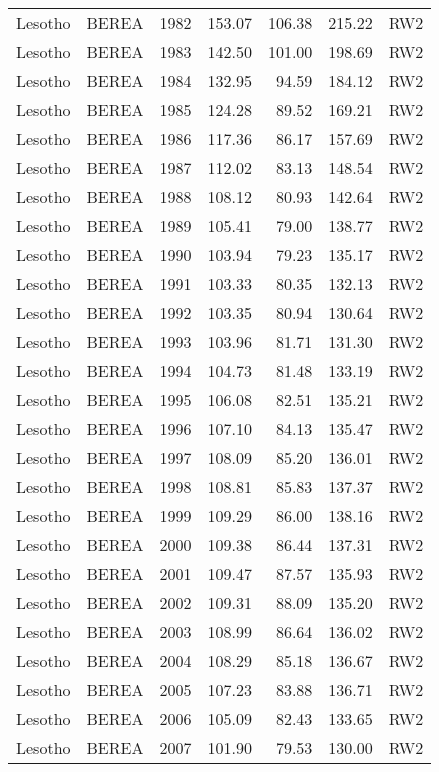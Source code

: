 \begin{longtable}{lllrrrl}
  Lesotho & BEREA & 1982 & 153.07 & 106.38 & 215.22 & RW2 \\ 
  Lesotho & BEREA & 1983 & 142.50 & 101.00 & 198.69 & RW2 \\ 
  Lesotho & BEREA & 1984 & 132.95 & 94.59 & 184.12 & RW2 \\ 
  Lesotho & BEREA & 1985 & 124.28 & 89.52 & 169.21 & RW2 \\ 
  Lesotho & BEREA & 1986 & 117.36 & 86.17 & 157.69 & RW2 \\ 
  Lesotho & BEREA & 1987 & 112.02 & 83.13 & 148.54 & RW2 \\ 
  Lesotho & BEREA & 1988 & 108.12 & 80.93 & 142.64 & RW2 \\ 
  Lesotho & BEREA & 1989 & 105.41 & 79.00 & 138.77 & RW2 \\ 
  Lesotho & BEREA & 1990 & 103.94 & 79.23 & 135.17 & RW2 \\ 
  Lesotho & BEREA & 1991 & 103.33 & 80.35 & 132.13 & RW2 \\ 
  Lesotho & BEREA & 1992 & 103.35 & 80.94 & 130.64 & RW2 \\ 
  Lesotho & BEREA & 1993 & 103.96 & 81.71 & 131.30 & RW2 \\ 
  Lesotho & BEREA & 1994 & 104.73 & 81.48 & 133.19 & RW2 \\ 
  Lesotho & BEREA & 1995 & 106.08 & 82.51 & 135.21 & RW2 \\ 
  Lesotho & BEREA & 1996 & 107.10 & 84.13 & 135.47 & RW2 \\ 
  Lesotho & BEREA & 1997 & 108.09 & 85.20 & 136.01 & RW2 \\ 
  Lesotho & BEREA & 1998 & 108.81 & 85.83 & 137.37 & RW2 \\ 
  Lesotho & BEREA & 1999 & 109.29 & 86.00 & 138.16 & RW2 \\ 
  Lesotho & BEREA & 2000 & 109.38 & 86.44 & 137.31 & RW2 \\ 
  Lesotho & BEREA & 2001 & 109.47 & 87.57 & 135.93 & RW2 \\ 
  Lesotho & BEREA & 2002 & 109.31 & 88.09 & 135.20 & RW2 \\ 
  Lesotho & BEREA & 2003 & 108.99 & 86.64 & 136.02 & RW2 \\ 
  Lesotho & BEREA & 2004 & 108.29 & 85.18 & 136.67 & RW2 \\ 
  Lesotho & BEREA & 2005 & 107.23 & 83.88 & 136.71 & RW2 \\ 
  Lesotho & BEREA & 2006 & 105.09 & 82.43 & 133.65 & RW2 \\ 
  Lesotho & BEREA & 2007 & 101.90 & 79.53 & 130.00 & RW2 \\ 

\end{longtable}
